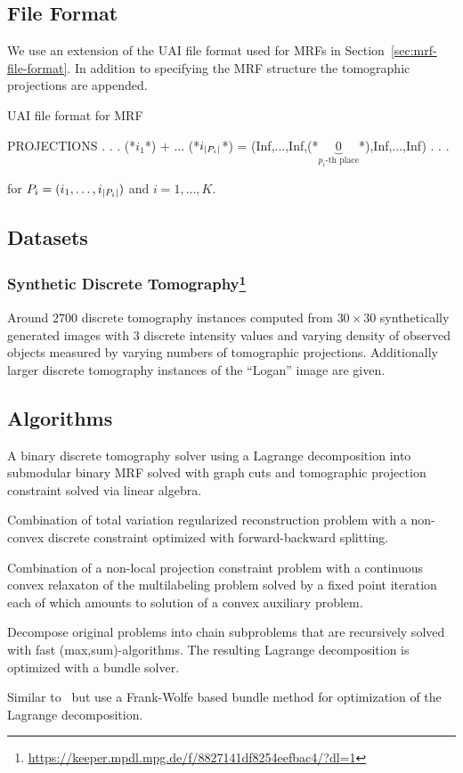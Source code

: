 \subsection{File Format}
We use an extension of the UAI file format used for MRFs in Section~\ref{sec:mrf-file-format}. In addition to specifying the  MRF structure the tomographic projections are appended.

\begin{fileformat}
UAI file format for MRF

PROJECTIONS
.
.
.
(*$i_1$*) + ... (*$i_{\lvert P_i\rvert}$*) =
    (Inf,...,Inf,(*$\underbrace{0}_{p_i\text{-th place}}$*),Inf,...,Inf)
.
.
.
\end{fileformat}
for $P_i = (i_1,\ldots,i_{\lvert P_i\rvert})$ and $i=1,\ldots,K$.

\subsection{Datasets}
\subsubsection[Synthetic Discrete Tomography]{Synthetic Discrete Tomography\footnote{\url{https://keeper.mpdl.mpg.de/f/8827141df8254eefbac4/?dl=1}}}
Around $2700$ discrete tomography instances computed from $30 \times 30$ synthetically generated images with 3 discrete intensity values and varying density of observed objects measured by varying numbers of tomographic projections.
Additionally larger discrete tomography instances of the ``Logan'' image are given.

\subsection{Algorithms}
\begin{description}[style=unboxed]
\item[Subgradient ascent on submodular MRF \& Projection~\cite{kappes2015tomogc}:]
    A binary discrete tomography solver using a Lagrange decomposition into submodular binary MRF solved with graph cuts and tomographic projection constraint solved via linear algebra.
\item[First-order optimization~\cite{zisler2016non}:]
    Combination of total variation regularized reconstruction problem with a non-convex discrete constraint optimized with forward-backward splitting.
\item[Fixed-point iteration~\cite{zisler2016discrete}:]
    Combination of a non-local projection constraint problem with a continuous convex relaxaton of the multilabeling problem solved by a fixed point iteration each of which amounts to solution of a convex auxiliary problem.
\item[Subgradient on decomposition into chain subproblems~\cite{kuske2017novel}:]
    Decompose original problems into chain subproblems that are recursively solved with fast (max,sum)-algorithms.
    The resulting Lagrange decomposition is optimized with a bundle solver.
\item[FW-Bundle Method~\cite{swoboda2019map}:]
    Similar to~\cite{kuske2017novel} but use a Frank-Wolfe based bundle method for optimization of the Lagrange decomposition.
\end{description}
